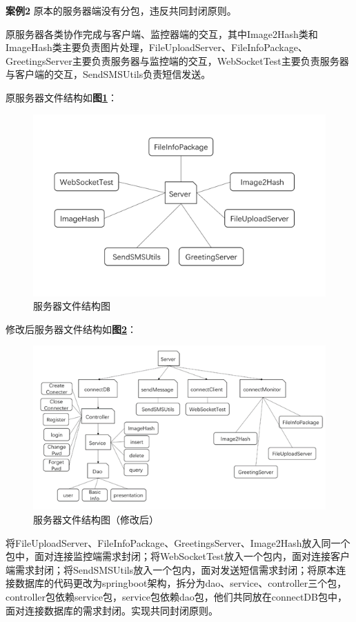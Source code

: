 \documentclass[article]{BJTU-thesis}
\begin{document}
\textbf{案例2} 原本的服务器端没有分包，违反共同封闭原则。

原服务器各类协作完成与客户端、监控器端的交互，其中Image2Hash类和ImageHash类主要负责图片处理，FileUploadServer、FileInfoPackage、GreetingsServer主要负责服务器与监控端的交互，WebSocketTest主要负责服务器与客户端的交互，SendSMSUtils负责短信发送。

原服务器文件结构如\textbf{图\ref{fig:fig18}}：

\begin{figure}[!htbp]
	\centering
	\includegraphics[scale=0.5]{img/15.png}
	\caption{服务器文件结构图}\label{fig:fig18}
\end{figure}

修改后服务器文件结构如\textbf{图\ref{fig:fig19}}：

\begin{figure}[!htbp]
	\centering
	\includegraphics[scale=0.8]{img/16.png}
	\caption{服务器文件结构图（修改后）}\label{fig:fig19}
\end{figure}

将FileUploadServer、FileInfoPackage、GreetingsServer、Image2Hash放入同一个包中，面对连接监控端需求封闭；将WebSocketTest放入一个包内，面对连接客户端需求封闭；将SendSMSUtils放入一个包内，面对发送短信需求封闭；将原本连接数据库的代码更改为springboot架构，拆分为dao、service、controller三个包，controller包依赖service包，service包依赖dao包，他们共同放在connectDB包中，面对连接数据库的需求封闭。实现共同封闭原则。
\end{document}
